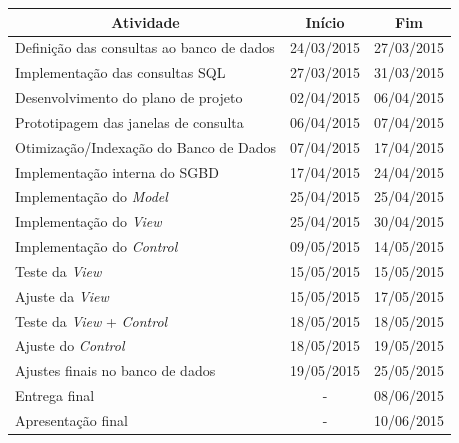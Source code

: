 \documentclass[a4paper,12pt]{article}
\begin{document}
{\normalsize %

\begin{longtable}{|l|c|c|}
\hline
\multicolumn{1}{|c|}{\textbf{Atividade}}  & \multicolumn{1}{c|}{\textbf{Início}} & \multicolumn{1}{c|}{\textbf{Fim}} \\ \hline
Definição das consultas ao banco de dados & 24/03/2015                           & 27/03/2015                        \\ \hline
Implementação das consultas SQL           & 27/03/2015                           & 31/03/2015                        \\ \hline
Desenvolvimento do plano de projeto       & 02/04/2015                           & 06/04/2015                        \\ \hline
Prototipagem das janelas de consulta      & 06/04/2015                           & 07/04/2015                        \\ \hline
Otimização/Indexação do Banco de Dados    & 07/04/2015                           & 17/04/2015                        \\ \hline
Implementação interna do SGBD             & 17/04/2015                           & 24/04/2015                        \\ \hline
Implementação do \textit{Model}                    & 25/04/2015                           & 25/04/2015                        \\ \hline
Implementação do \textit{View}                     & 25/04/2015                           & 30/04/2015                        \\ \hline
Implementação do \textit{Control}                  & 09/05/2015                           & 14/05/2015                        \\ \hline
Teste da \textit{View}                             & 15/05/2015                           & 15/05/2015                        \\ \hline
Ajuste da \textit{View}                          & 15/05/2015                           & 17/05/2015                        \\ \hline
Teste da \textit{View} + \textit{Control}                   & 18/05/2015                           & 18/05/2015                        \\ \hline
Ajuste do \textit{Control}                       & 18/05/2015                           & 19/05/2015                        \\ \hline
Ajustes finais no banco de dados        & 19/05/2015                           & 25/05/2015                        \\ \hline
Entrega final                             & \multicolumn{1}{c|}{-}               & 08/06/2015                        \\ \hline
Apresentação final                        & \multicolumn{1}{c|}{-}               & 10/06/2015                        \\ \hline
\end{longtable}



}
\end{document}
